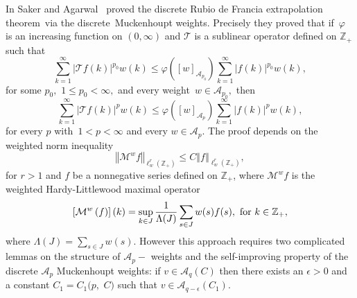 \documentclass[a4paper]{amsart}
\theoremstyle{plain}
\numberwithin{equation}{section}
\begin{document}
In \cite{saker} Saker and Agarwal \ proved the discrete Rubio de Francia
extrapolation theorem\ via the discrete\ Muckenhoupt weights. Precisely they
proved that if\ $\varphi $ is an increasing function on $(0,\infty )$ and $%
\mathcal{T}$ is a sublinear operator defined on $\mathbb{Z}_{+}$ such that%
\begin{equation*}
\sum_{k=1}^{\infty }\left\vert \mathcal{T}f(k)\right\vert ^{p_{0}}w(k)\leq
\varphi \left( \left[ w\right] _{\mathcal{A}_{p_{0}}}\right)
\sum_{k=1}^{\infty }\left\vert f(k)\right\vert ^{p_{0}}w(k),
\end{equation*}%
for some $p_{0},$ $1\leq p_{0}<\infty ,$ and every weight\ $w\in \mathcal{A}%
_{p_{0}},$ then 
\begin{equation*}
\sum_{k=1}^{\infty }\left\vert \mathcal{T}f(k)\right\vert ^{p}w(k)\leq
\varphi \left( \left[ w\right] _{\mathcal{A}_{p}}\right) \sum_{k=1}^{\infty
}\left\vert f(k)\right\vert ^{p}w(k),
\end{equation*}%
for every $p$ with\ $1<p<\infty $ and every $w\in \mathcal{A}_{p}.$ The
proof depends on the weighted norm inequality 
\begin{equation}
\left\Vert \mathcal{M}^{w}f\right\Vert _{\ell _{w}^{r}\left( \mathbb{Z}%
_{+}\right) }\leq C\left\Vert f\right\Vert _{\ell _{w}^{r}\left( \mathbb{Z}%
_{+}\right) },  \label{dg}
\end{equation}%
for $r>1$ and $f$ be a nonnegative series defined on $\mathbb{Z}_{+}$, where 
$\mathcal{M}^{w}f$ is the weighted Hardy-Littlewood maximal operator 
\begin{equation}
\left[ \mathcal{M}^{w}\left( f\right) \right] (k)=\sup_{k\in J}\frac{1}{%
\Lambda (J)}\sum_{s\in J}w(s)f(s),\text{ for }k\in \mathbb{Z}_{+},
\label{1.2q}
\end{equation}%
where $\Lambda (J)=\sum_{s\in J}w(s)$. However this approach requires two
complicated lemmas on the structure of $\mathcal{A}_{p}-$ weights and the
self-improving property of the discrete $\mathcal{A}_{p}$ Muckenhoupt
weights: if $v\in \mathcal{A}_{q}(C)$ then there exists an $\epsilon >0$ and
a constant $C_{1}=C_{1}(p,$ $C)$ such that $v\in \mathcal{A}_{q-\epsilon
}(C_{1})$.
\end{document}
